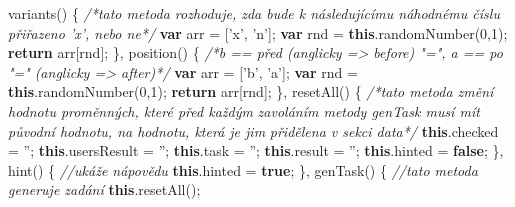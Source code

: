 \documentclass[
]{article}
\newenvironment{Shaded}{}{}
\newcommand{\AttributeTok}[1]{\textcolor[rgb]{0.49,0.56,0.16}{#1}}
\newcommand{\CommentTok}[1]{\textcolor[rgb]{0.38,0.63,0.69}{\textit{#1}}}
\newcommand{\ControlFlowTok}[1]{\textcolor[rgb]{0.00,0.44,0.13}{\textbf{#1}}}
\newcommand{\DecValTok}[1]{\textcolor[rgb]{0.25,0.63,0.44}{#1}}
\newcommand{\KeywordTok}[1]{\textcolor[rgb]{0.00,0.44,0.13}{\textbf{#1}}}
\newcommand{\NormalTok}[1]{#1}
\newcommand{\OperatorTok}[1]{\textcolor[rgb]{0.40,0.40,0.40}{#1}}
\newcommand{\StringTok}[1]{\textcolor[rgb]{0.25,0.44,0.63}{#1}}
\begin{document}
\begin{Shaded}
\begin{Highlighting}[]
            \AttributeTok{variants}\NormalTok{() }\OperatorTok{\{} \CommentTok{/*tato metoda rozhoduje, zda bude k následujícímu náhodnému číslu }
\CommentTok{                            přiřazeno 'x', nebo ne*/}
                \KeywordTok{var}\NormalTok{ arr }\OperatorTok{=}\NormalTok{ [}\StringTok{'x'}\OperatorTok{,} \StringTok{'n'}\NormalTok{]}\OperatorTok{;}
                \KeywordTok{var}\NormalTok{ rnd }\OperatorTok{=} \KeywordTok{this}\NormalTok{.}\AttributeTok{randomNumber}\NormalTok{(}\DecValTok{0}\OperatorTok{,}\DecValTok{1}\NormalTok{)}\OperatorTok{;}
                \ControlFlowTok{return}\NormalTok{ arr[rnd]}\OperatorTok{;}
            \OperatorTok{\},}
            \AttributeTok{position}\NormalTok{() }\OperatorTok{\{}    \CommentTok{/*b == před (anglicky => before) "=", a == po "=" }
\CommentTok{                (anglicky => after)*/}   
                \KeywordTok{var}\NormalTok{ arr }\OperatorTok{=}\NormalTok{ [}\StringTok{'b'}\OperatorTok{,} \StringTok{'a'}\NormalTok{]}\OperatorTok{;}
                \KeywordTok{var}\NormalTok{ rnd }\OperatorTok{=} \KeywordTok{this}\NormalTok{.}\AttributeTok{randomNumber}\NormalTok{(}\DecValTok{0}\OperatorTok{,}\DecValTok{1}\NormalTok{)}\OperatorTok{;}
                \ControlFlowTok{return}\NormalTok{ arr[rnd]}\OperatorTok{;}
            \OperatorTok{\},}
            \AttributeTok{resetAll}\NormalTok{() }\OperatorTok{\{} \CommentTok{/*tato metoda změní hodnotu proměnných, které před každým }
\CommentTok{                zavoláním metody genTask musí mít původní hodnotu, na hodnotu, která je jim }
\CommentTok{                přidělena v sekci data*/}
                \KeywordTok{this}\NormalTok{.}\AttributeTok{checked} \OperatorTok{=} \StringTok{''}\OperatorTok{;}
                \KeywordTok{this}\NormalTok{.}\AttributeTok{usersResult} \OperatorTok{=} \StringTok{''}\OperatorTok{;}              
                \KeywordTok{this}\NormalTok{.}\AttributeTok{task} \OperatorTok{=} \StringTok{''}\OperatorTok{;}
                \KeywordTok{this}\NormalTok{.}\AttributeTok{result} \OperatorTok{=} \StringTok{''}\OperatorTok{;}
                \KeywordTok{this}\NormalTok{.}\AttributeTok{hinted} \OperatorTok{=} \KeywordTok{false}\OperatorTok{;}
            \OperatorTok{\},}
            \AttributeTok{hint}\NormalTok{() }\OperatorTok{\{} \CommentTok{//ukáže nápovědu}
                \KeywordTok{this}\NormalTok{.}\AttributeTok{hinted} \OperatorTok{=} \KeywordTok{true}\OperatorTok{;}
            \OperatorTok{\},}
            \AttributeTok{genTask}\NormalTok{() }\OperatorTok{\{} \CommentTok{//tato metoda generuje zadání}
                \KeywordTok{this}\NormalTok{.}\AttributeTok{resetAll}\NormalTok{()}\OperatorTok{;}

\end{Highlighting}
\end{Shaded}
\end{document}
